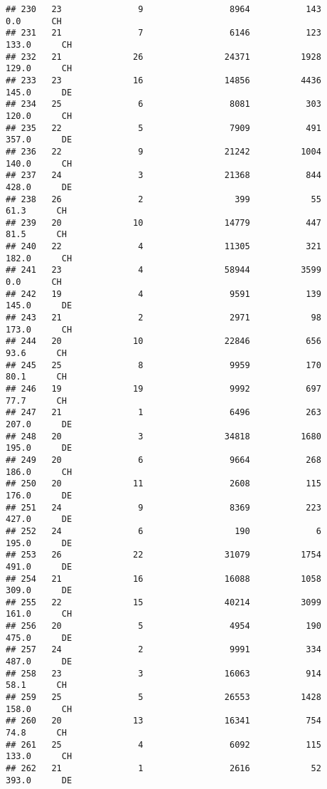\documentclass[
]{article}
\begin{document}
\begin{verbatim}
## 230   23               9                 8964           143      0.0      CH
## 231   21               7                 6146           123    133.0      CH
## 232   21              26                24371          1928    129.0      CH
## 233   23              16                14856          4436    145.0      DE
## 234   25               6                 8081           303    120.0      CH
## 235   22               5                 7909           491    357.0      DE
## 236   22               9                21242          1004    140.0      CH
## 237   24               3                21368           844    428.0      DE
## 238   26               2                  399            55     61.3      CH
## 239   20              10                14779           447     81.5      CH
## 240   22               4                11305           321    182.0      CH
## 241   23               4                58944          3599      0.0      CH
## 242   19               4                 9591           139    145.0      DE
## 243   21               2                 2971            98    173.0      CH
## 244   20              10                22846           656     93.6      CH
## 245   25               8                 9959           170     80.1      CH
## 246   19              19                 9992           697     77.7      CH
## 247   21               1                 6496           263    207.0      DE
## 248   20               3                34818          1680    195.0      DE
## 249   20               6                 9664           268    186.0      CH
## 250   20              11                 2608           115    176.0      DE
## 251   24               9                 8369           223    427.0      DE
## 252   24               6                  190             6    195.0      DE
## 253   26              22                31079          1754    491.0      DE
## 254   21              16                16088          1058    309.0      DE
## 255   22              15                40214          3099    161.0      CH
## 256   20               5                 4954           190    475.0      DE
## 257   24               2                 9991           334    487.0      DE
## 258   23               3                16063           914     58.1      CH
## 259   25               5                26553          1428    158.0      CH
## 260   20              13                16341           754     74.8      CH
## 261   25               4                 6092           115    133.0      CH
## 262   21               1                 2616            52    393.0      DE

\end{verbatim}
\end{document}
